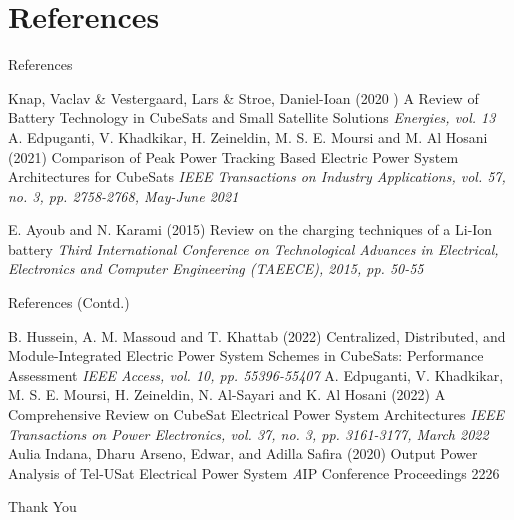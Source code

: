 \documentclass[aspectratio=169]{beamer}
\begin{document}
	\section{References}
	\begin{frame}{References}
		
		\begin{thebibliography}{9}
			
			Knap, Vaclav \& Vestergaard, Lars \& Stroe, Daniel-Ioan (2020	)
			\newblock A Review of Battery Technology in CubeSats
			and Small Satellite Solutions
			\newblock \emph{Energies, vol. 13}	
			A. Edpuganti, V. Khadkikar, H. Zeineldin, M. S. E. Moursi and M. Al Hosani (2021)
			\newblock Comparison of Peak Power Tracking Based Electric Power System Architectures for CubeSats
			\newblock \emph{IEEE Transactions on Industry Applications, vol. 57, no. 3, pp. 2758-2768, May-June 2021}
			
			E. Ayoub and N. Karami (2015)
			\newblock Review on the charging techniques of a Li-Ion battery
			\newblock \emph{Third International Conference on Technological Advances in Electrical, Electronics and Computer Engineering (TAEECE), 2015, pp. 50-55}
		\end{thebibliography}
	\end{frame}
	\begin{frame}{References (Contd.)}
		
		\begin{thebibliography}{9}
			
			\bibitem[4]{p1}
			B. Hussein, A. M. Massoud and T. Khattab (2022)
			\newblock Centralized, Distributed, and Module-Integrated Electric Power System Schemes in CubeSats: Performance Assessment
			\newblock \emph{ IEEE Access, vol. 10, pp. 55396-55407}
			A. Edpuganti, V. Khadkikar, M. S. E. Moursi, H. Zeineldin, N. Al-Sayari and K. Al Hosani (2022)
			\newblock A Comprehensive Review on CubeSat Electrical Power System Architectures
			\newblock \emph { IEEE Transactions on Power Electronics, vol. 37, no. 3, pp. 3161-3177, March 2022}
			\bibitem[6]{p1}
			Aulia Indana, Dharu Arseno, Edwar, and Adilla Safira (2020)
			\newblock Output Power Analysis of Tel-USat Electrical Power System 
			\newblock \emph  AIP Conference Proceedings 2226
			
			
			
			
			
			
			
			
			
			
		\end{thebibliography}
	\end{frame}
	
	\begin{frame}
		\huge \center Thank You
		
	\end{frame}
\end{document}
